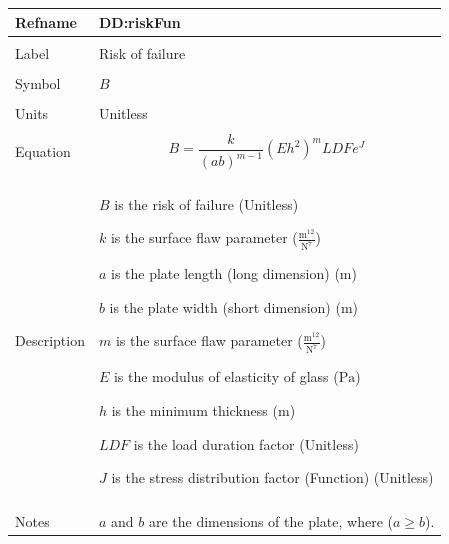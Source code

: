 \documentclass[12pt]{article}
\begin{document}
\vspace{\baselineskip}
\noindent
\begin{minipage}{\textwidth}
\begin{tabular}{>{\raggedright}p{}>{\raggedright\arraybackslash}p{}}
\toprule \textbf{Refname} & \textbf{DD:riskFun}
\label{DD:riskFun}
\\ \midrule \\
Label & Risk of failure
        
\\ \midrule \\
Symbol & $B$
         
\\ \midrule \\
Units & Unitless
        
\\ \midrule \\
Equation & \begin{displaymath}
           B=\frac{k}{\left(a b\right)^{m-1}} \left(E h^{2}\right)^{m} \mathit{LDF} e^{J}
           \end{displaymath}
\\ \midrule \\
Description & \begin{symbDescription}
              \item{$B$ is the risk of failure (Unitless)}
              \item{$k$ is the surface flaw parameter ($\frac{\text{m}^{12}}{\text{N}^{7}}$)}
              \item{$a$ is the plate length (long dimension) (${\text{m}}$)}
              \item{$b$ is the plate width (short dimension) (${\text{m}}$)}
              \item{$m$ is the surface flaw parameter ($\frac{\text{m}^{12}}{\text{N}^{7}}$)}
              \item{$E$ is the modulus of elasticity of glass (${\text{Pa}}$)}
              \item{$h$ is the minimum thickness (${\text{m}}$)}
              \item{$\mathit{LDF}$ is the load duration factor (Unitless)}
              \item{$J$ is the stress distribution factor (Function) (Unitless)}
              \end{symbDescription}
\\ \midrule \\
Notes & $a$ and $b$ are the dimensions of the plate, where ($a\geq{}b$).
        

\end{tabular}
\end{minipage}
\end{document}
